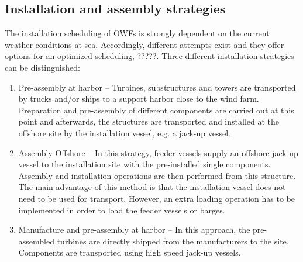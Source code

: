 \subsection{Installation and assembly strategies}
The installation scheduling of OWFs is strongly dependent on the current weather conditions at sea. Accordingly, different attempts exist and they offer options for an optimized scheduling, ?????. Three different installation strategies can be distinguished:

\begin{enumerate}
\item Pre-assembly at harbor -- Turbines, substructures and towers are transported by trucks and/or ships to a support harbor close to the wind farm. Preparation and pre-assembly of different components are carried out at this point and afterwards, the structures are transported and installed at the offshore site by the installation vessel, e.g. a jack-up vessel.
\item Assembly Offshore -- In this strategy, feeder vessels supply an offshore jack-up vessel to the installation site with the pre-installed single components. Assembly and installation operations are then performed from this structure. The main advantage of this method is that the installation vessel does not need to be used for transport. However, an extra loading operation has to be implemented in order to load the feeder vessels or barges.
\item Manufacture and pre-assembly at harbor -- In this approach, the pre-assembled turbines are directly shipped from the manufacturers to the site. Components are transported using high speed jack-up vessels.
\end{enumerate}